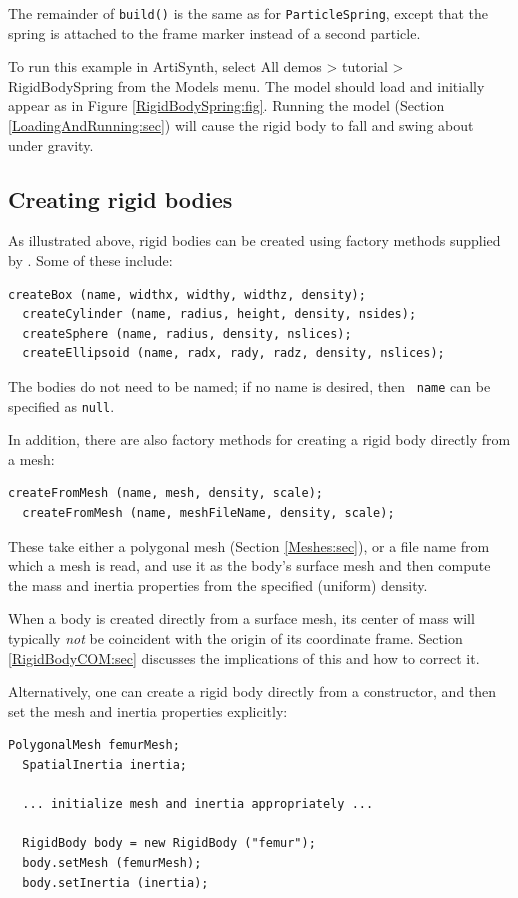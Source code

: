 The remainder of {\tt build()} is the same as for {\tt ParticleSpring},
except that the spring is attached to the frame marker instead of a
second particle.

To run this example in ArtiSynth, select {\sf All demos > tutorial >
RigidBodySpring} from the {\sf Models} menu. The model should load and
initially appear as in Figure \ref{RigidBodySpring:fig}.  Running the
model (Section \ref{LoadingAndRunning:sec}) will cause the rigid body
to fall and swing about under gravity.

\subsection{Creating rigid bodies}

As illustrated above, rigid bodies can be created using factory
methods supplied by .
Some of these include:
\begin{lstlisting}[]
  createBox (name, widthx, widthy, widthz, density);
  createCylinder (name, radius, height, density, nsides);
  createSphere (name, radius, density, nslices);
  createEllipsoid (name, radx, rady, radz, density, nslices);
\end{lstlisting}
%
The bodies do not need to be named; if no name is desired, then {\tt
name} can be specified as {\tt null}.

In addition, there are also
factory methods for creating a rigid body directly from a mesh:
\begin{lstlisting}[]
  createFromMesh (name, mesh, density, scale);
  createFromMesh (name, meshFileName, density, scale);
\end{lstlisting}
%
These take either a polygonal mesh (Section \ref{Meshes:sec}), or a
file name from which a mesh is read, and use it as the body's surface
mesh and then compute the mass and inertia properties from the specified
(uniform) density.

\begin{sideblock}
When a body is created directly from a surface mesh, its center of
mass will typically {\it not} be coincident with the origin of its
coordinate frame. Section \ref{RigidBodyCOM:sec} discusses the
implications of this and how to correct it.
\end{sideblock}

Alternatively, one can create a rigid body directly from a
constructor, and then set the mesh and inertia properties explicitly:
%
\begin{lstlisting}[]
  PolygonalMesh femurMesh;
  SpatialInertia inertia;

  ... initialize mesh and inertia appropriately ...

  RigidBody body = new RigidBody ("femur");
  body.setMesh (femurMesh);
  body.setInertia (inertia);
\end{lstlisting}
%

